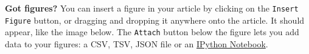 \textbf{Got figures?} You can insert a figure in your article by clicking on the \verb|Insert Figure| button, or dragging and dropping it anywhere onto the article. It should appear, like the image below. The \verb|Attach| button below the figure lets you add data to your figures: a CSV, TSV, JSON file or an \href{https://www.authorea.com/11070}{IPython Notebook}.